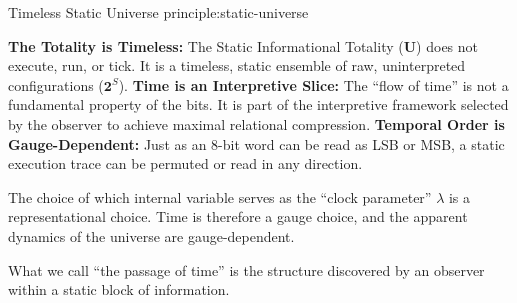 \begin{principle}{Timeless Static Universe}
{principle:static-universe}

\textbf{The Totality is Timeless:} The Static Informational Totality ($\mathbf{U}$) does not execute, run, or tick. It is a timeless, static ensemble of raw, uninterpreted configurations ($\mathbf{2}^S$). 
\textbf{Time is an Interpretive Slice:} The ``flow of time'' is not a fundamental property of the bits. It is part of the interpretive framework selected by the observer to achieve maximal relational compression.
\textbf{Temporal Order is Gauge-Dependent:} Just as an 8-bit word can be read as LSB or MSB, a static execution trace can be permuted or read in any direction.

The choice of which internal variable serves as the ``clock parameter'' $\lambda$ is a representational choice.
Time is therefore a gauge choice, and the apparent dynamics of the universe are gauge-dependent.
\end{principle}

What we call ``the passage of time'' is the structure discovered by an observer within a static block of information.


